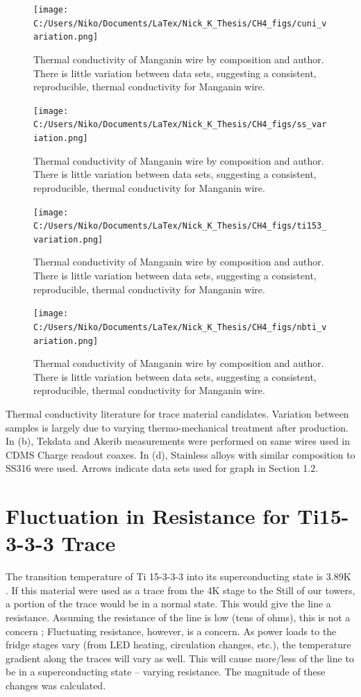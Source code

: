 \documentclass{report}
\begin{document}
\begin{appendices}
\begin{figure}[h]
\centering
\texttt{[image: C:/Users/Niko/Documents/LaTex/Nick\_K\_Thesis/CH4\_figs/cuni\_variation.png]}
\caption{Thermal conductivity of Manganin wire by composition and author. There is little variation between data sets, suggesting a consistent, reproducible, thermal conductivity for Manganin wire.}
\end{figure}

\begin{figure}[h]
\centering
\texttt{[image: C:/Users/Niko/Documents/LaTex/Nick\_K\_Thesis/CH4\_figs/ss\_variation.png]}
\caption{Thermal conductivity of Manganin wire by composition and author. There is little variation between data sets, suggesting a consistent, reproducible, thermal conductivity for Manganin wire.}
\end{figure}

\begin{figure}[h]
\centering
\texttt{[image: C:/Users/Niko/Documents/LaTex/Nick\_K\_Thesis/CH4\_figs/ti153\_variation.png]}
\caption{Thermal conductivity of Manganin wire by composition and author. There is little variation between data sets, suggesting a consistent, reproducible, thermal conductivity for Manganin wire.}
\end{figure}

\begin{figure}[h]
\centering
\texttt{[image: C:/Users/Niko/Documents/LaTex/Nick\_K\_Thesis/CH4\_figs/nbti\_variation.png]}
\caption{Thermal conductivity of Manganin wire by composition and author. There is little variation between data sets, suggesting a consistent, reproducible, thermal conductivity for Manganin wire.}
\end{figure}


Thermal conductivity literature for trace material candidates. Variation between samples is largely due to varying thermo-mechanical treatment after production. In (b), Tekdata and Akerib measurements were performed on same wires used in CDMS Charge readout coaxes. In (d), Stainless alloys with similar composition to SS316 were used. Arrows indicate data sets used for graph in Section 1.2.



\chapter{Fluctuation in Resistance for Ti15-3-3-3 Trace}
The transition temperature of Ti 15-3-3-3 into its superconducting state is 3.89K \cite{wik}. If this material were used as a trace from the 4K stage to the Still of our towers, a portion of the trace would be in a normal state. This would give the line a resistance. Assuming the resistance of the line is low (tens of ohms), this is not a concern ; Fluctuating resistance, however, is a concern. As power loads to the fridge stages vary (from LED heating, circulation changes, etc.), the temperature gradient along the traces will vary as well. This will cause more/less of the line to be in a superconducting state -- varying resistance. The magnitude of these changes was calculated.


\end{appendices}
\end{document}
